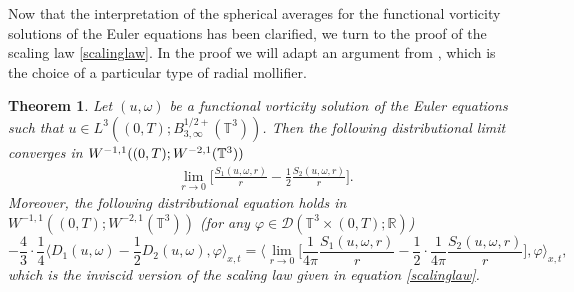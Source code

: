 \documentclass[12pt,a4paper]{article}
\newtheorem{theorem}{Theorem}[section]
\theoremstyle{definition}
\theoremstyle{remark}
\numberwithin{equation}{section}
\begin{document}
Now that the interpretation of the spherical averages for the functional vorticity solutions of the Euler equations has been clarified, we turn to the proof of the scaling law \eqref{scalinglaw}. In the proof we will adapt an argument from \cite{novackscaling}, which is the choice of a particular type of radial mollifier.
\begin{theorem} \label{scalingthm}
Let $(u,\omega)$ be a functional vorticity solution of the Euler equations such that $u \in L^3 ((0,T);B^{1/2+}_{3,\infty} (\mathbb{T}^3))$. Then the following distributional limit converges in $W^{-1,1} ((0,T); \linebreak W^{-2,1} (\mathbb{T}^3))$
\begin{align}
&\lim_{r \rightarrow 0} \bigg[ \frac{S_1 (u,\omega,r)}{r} - \frac{1}{2} \frac{S_2 (u,\omega,r)}{r} \bigg].
\end{align}
Moreover, the following distributional equation holds in $W^{-1,1} ((0,T); W^{-2,1} (\mathbb{T}^3))$ (for any $\varphi \in \mathcal{D} (\mathbb{T}^3 \times (0,T);\mathbb{R})$)
\begin{equation}
-\frac{4}{3} \cdot \frac{1}{4} \bigg\langle D_{1} (u, \omega) - \frac{1}{2} D_{2} (u, \omega) , \varphi \bigg\rangle_{x,t} = \bigg\langle \lim_{r \rightarrow 0} \bigg[ \frac{1}{4 \pi} \frac{S_1 (u,\omega,r)}{r} - \frac{1}{2} \cdot \frac{1}{4 \pi} \frac{S_2 (u,\omega,r)}{r} \bigg] , \varphi \bigg\rangle_{x,t},
\end{equation}
which is the inviscid version of the scaling law given in equation \eqref{scalinglaw}.
\end{theorem}
\end{document}
